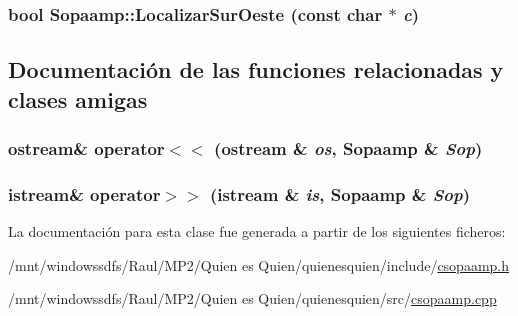 \hypertarget{class_sopaamp_e9d0a1207aad828d2e4f208ed0ac99b5}{
\subsubsection[{LocalizarSurOeste}]{\setlength{\rightskip}{0pt plus 5cm}bool Sopaamp::LocalizarSurOeste (const char $\ast$ {\em c})}}
\label{class_sopaamp_e9d0a1207aad828d2e4f208ed0ac99b5}




\subsection{Documentación de las funciones relacionadas y clases amigas}
\hypertarget{class_sopaamp_aa0c812cb68673acacbc91356133ba9e}{
\subsubsection[{operator$<$$<$}]{\setlength{\rightskip}{0pt plus 5cm}ostream\& operator$<$$<$ (ostream \& {\em os}, \/  {\bf Sopaamp} \& {\em Sop})}}
\label{class_sopaamp_aa0c812cb68673acacbc91356133ba9e}


\hypertarget{class_sopaamp_a96bf6a82f391bb7b109019396d21c30}{
\subsubsection[{operator$>$$>$}]{\setlength{\rightskip}{0pt plus 5cm}istream\& operator$>$$>$ (istream \& {\em is}, \/  {\bf Sopaamp} \& {\em Sop})}}
\label{class_sopaamp_a96bf6a82f391bb7b109019396d21c30}




La documentación para esta clase fue generada a partir de los siguientes ficheros:\begin{CompactItemize}
\item 
/mnt/windowssdfs/Raul/MP2/Quien es Quien/quienesquien/include/\hyperlink{csopaamp_8h}{csopaamp.h}\item 
/mnt/windowssdfs/Raul/MP2/Quien es Quien/quienesquien/src/\hyperlink{csopaamp_8cpp}{csopaamp.cpp}\end{CompactItemize}
